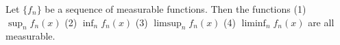 Let $\{f_n\}$ be a sequence of measurable functions. Then the functions
(1) $\sup_n f_n(x)$
(2) $\inf_n f_n(x)$
(3) $\limsup_n f_n(x)$
(4) $\liminf_n f_n(x)$
are all measurable.

